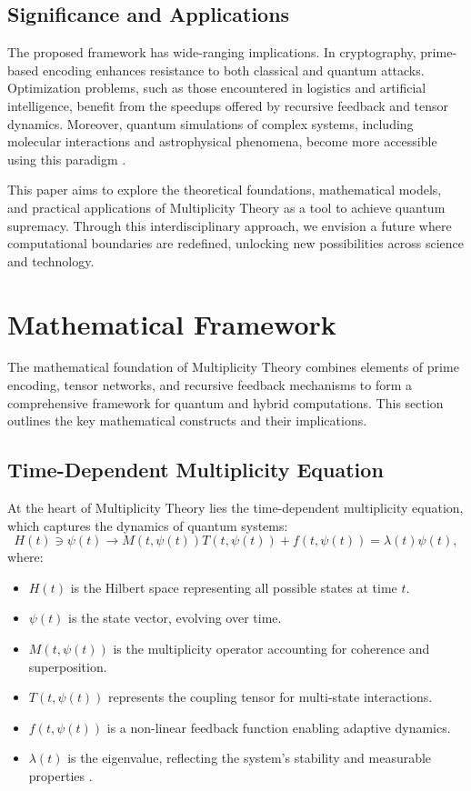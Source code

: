 \documentclass{article}
\theoremstyle{plain}
\begin{document}
\subsection{Significance and Applications}
The proposed framework has wide-ranging implications. In cryptography, prime-based encoding enhances resistance to both classical and quantum attacks. Optimization problems, such as those encountered in logistics and artificial intelligence, benefit from the speedups offered by recursive feedback and tensor dynamics. Moreover, quantum simulations of complex systems, including molecular interactions and astrophysical phenomena, become more accessible using this paradigm \cite{shor1999algorithms, grover1996search}.

This paper aims to explore the theoretical foundations, mathematical models, and practical applications of Multiplicity Theory as a tool to achieve quantum supremacy. Through this interdisciplinary approach, we envision a future where computational boundaries are redefined, unlocking new possibilities across science and technology.

\section{Mathematical Framework}

The mathematical foundation of Multiplicity Theory combines elements of prime encoding, tensor networks, and recursive feedback mechanisms to form a comprehensive framework for quantum and hybrid computations. This section outlines the key mathematical constructs and their implications.

\subsection{Time-Dependent Multiplicity Equation}
At the heart of Multiplicity Theory lies the time-dependent multiplicity equation, which captures the dynamics of quantum systems:
\begin{equation}
H(t) \ni \psi(t) \to M(t, \psi(t))T(t, \psi(t)) + f(t, \psi(t)) = \lambda(t)\psi(t),
\end{equation}
where:
\begin{itemize}
    \item $H(t)$ is the Hilbert space representing all possible states at time $t$.
    \item $\psi(t)$ is the state vector, evolving over time.
    \item $M(t, \psi(t))$ is the multiplicity operator accounting for coherence and superposition.
    \item $T(t, \psi(t))$ represents the coupling tensor for multi-state interactions.
    \item $f(t, \psi(t))$ is a non-linear feedback function enabling adaptive dynamics.
    \item $\lambda(t)$ is the eigenvalue, reflecting the system's stability and measurable properties \cite{wolfram2020hypergraph}.
\end{itemize}
\end{document}
